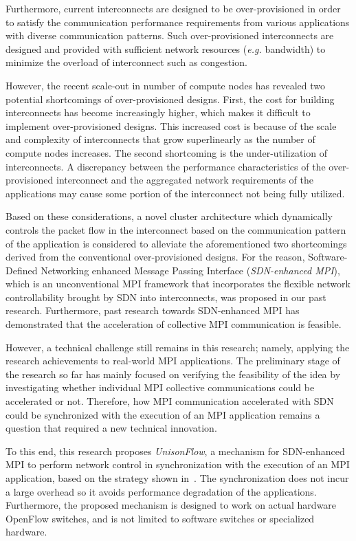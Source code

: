 Furthermore, current interconnects are designed to be over-provisioned
in order to satisfy the communication performance requirements from
various applications with diverse communication patterns. Such
over-provisioned interconnects are designed and provided with sufficient
network resources (\emph{e.g.} bandwidth) to minimize the overload of
interconnect such as congestion.

However, the recent scale-out in number of compute nodes has revealed
two potential shortcomings of over-provisioned designs. First, the cost
for building interconnects has become increasingly higher, which makes it
difficult to implement over-provisioned designs. This increased cost is
because of the scale and complexity of interconnects that grow
superlinearly as the number of compute nodes increases. The second
shortcoming is the under-utilization of interconnects. A discrepancy
between the performance characteristics of the over-provisioned
interconnect and the aggregated network requirements of the applications
may cause some portion of the interconnect not being fully utilized.

Based on these considerations, a novel cluster architecture which dynamically
controls the packet flow in the interconnect based on the communication
pattern of the application is considered to alleviate the aforementioned two
shortcomings derived from the conventional over-provisioned designs. For the
reason, Software-Defined Networking enhanced Message Passing Interface
(\emph{SDN-enhanced MPI}), which is an unconventional MPI framework that
incorporates the flexible network controllability brought by SDN into
interconnects, was proposed in our past research. Furthermore, past research
towards SDN-enhanced MPI has demonstrated that the acceleration of collective
MPI communication is feasible.

However, a technical challenge still remains in this research; namely,
applying the research achievements to real-world MPI applications.
The preliminary stage of the research so far has mainly focused on
verifying the feasibility of the idea by investigating whether
individual MPI collective communications could be accelerated or not.
Therefore, how MPI communication accelerated with SDN could be
synchronized with the execution of an MPI application remains a
question that required a new technical innovation.

To this end, this research proposes \emph{UnisonFlow}, a mechanism for
SDN-enhanced MPI to perform network control in synchronization with the
execution of an MPI application, based on the strategy shown
in~\autocite{Takahashi2015}. The synchronization does not incur a large
overhead so it avoids performance degradation of the applications.
Furthermore, the proposed mechanism is designed to work on actual hardware
OpenFlow switches, and is not limited to software switches or specialized
hardware.

